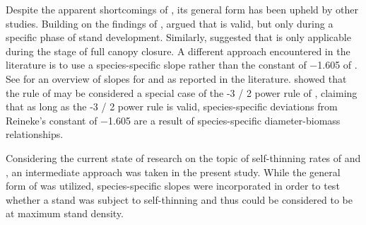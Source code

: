 Despite the apparent shortcomings of , its general form has been upheld by other studies.  Building on the findings of \textcite{Drew1979}, \textcite{VanderSchaaf2010,VanderSchaaf2008} argued that  is valid, but only during a specific phase of stand development.  Similarly, \textcite{Zeide1985} suggested that   is only applicable during the stage of full canopy closure.  A different approach encountered in the literature is to use a species-specific slope rather than the constant of \num{-1.605} of  \parencite{MacKinney1935,Pretzsch2005,Charru2012,Pretzsch2006,Río2001,Sterba1987,Vacchiano2013,Vospernik2015,Zeide1985,Zeide1987,VanderSchaaf2007}.  See  for an overview of slopes for \beech{} and \spruce{} as reported in the literature.  \textcite{Pretzsch2000,Pretzsch2002} showed that the rule of \textcite{Reineke1933} may be considered a special case of the \num{-3 / 2} power rule of \textcite{Yoda1963}, claiming that as long as the \num{-3 / 2} power rule is valid, species-specific deviations from Reineke’s constant of \num{-1.605} are a result of species-specific diameter-biomass relationships.

Considering the current state of research on the topic of self-thinning rates of \beech{} and \spruce{}, an intermediate approach was taken in the present study.  While the general form of  was utilized, species-specific slopes were incorporated in order to test whether a stand was subject to self-thinning and thus could be considered to be at maximum stand density.

